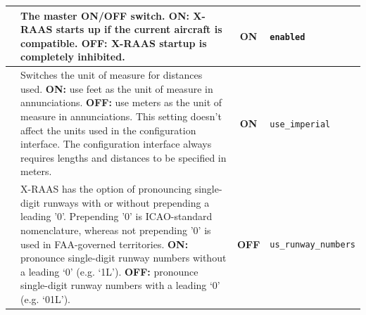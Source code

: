 \documentclass[a4paper,12pt]{article}
\newcommand{\confopt}[1]{\texttt{#1}}
\begin{document}
{\footnotesize
\begin{center}
\tablelasttail{\hline}
\begin{supertabular}{|c|p{8cm}|c|l|}

 &
The master ON/OFF switch.\newline
\textbf{ON:} X-RAAS starts up if the current aircraft is compatible.\newline
\textbf{OFF:} X-RAAS startup is completely inhibited. &
\textbf{ON} &
\confopt{enabled} \\

\hline

 &
Switches the unit of measure for distances used.\newline
\textbf{ON:} use feet as the unit of measure in annunciations.\newline
\textbf{OFF:} use meters as the unit of measure in annunciations.\newline
This setting doesn't affect the units used in the configuration
interface. The configuration interface always requires lengths and
distances to be specified in meters. & \textbf{ON} &
\confopt{use\_imperial} \\

\hline

 &
X-RAAS has the option of pronouncing single-digit runways with or without
prepending a leading '0'. Prepending '0' is ICAO-standard nomenclature,
whereas not prepending '0' is used in FAA-governed territories.\newline
\textbf{ON:} pronounce single-digit runway numbers without a leading `0'
(e.g. `1L').\newline
\textbf{OFF:} pronounce single-digit runway numbers with a leading `0'
(e.g. `01L'). & \textbf{OFF} & \confopt{us\_runway\_numbers} \\


\end{supertabular}
\end{center}}
\end{document}
